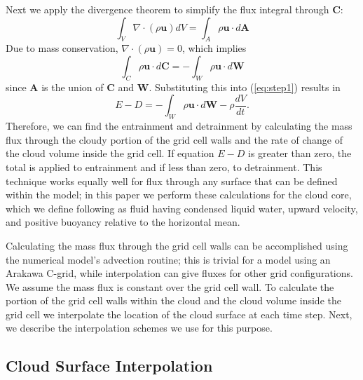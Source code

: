 \documentclass[12pt]{article}
\begin{document}
Next we apply the divergence theorem to simplify the flux integral through 
$\mathbf{C}$:
\begin{equation}
\label{eq:divergence} 
\int_{V} \nabla \cdot (\rho \mathbf{u}) dV = 
  \int_{A} \rho \mathbf{u}\cdot d\mathbf{A}
\end{equation}
Due to mass conservation, $\nabla \cdot (\rho \mathbf{u}) = 0$, which implies
\begin{equation}
\label{eq:divergence3} 
\int_{C} \rho \mathbf{u}\cdot d\mathbf{C} = - \int_{W} \rho \mathbf{u}\cdot d\mathbf{W}
\end{equation}
since $\mathbf{A}$ is the union of $\mathbf{C}$ and $\mathbf{W}$.  Substituting
this into (\ref{eq:step1}) results in
\begin{equation}
\label{eq:entrainment_detrainment} 
E - D = - \int_W \rho \mathbf{u} \cdot d\mathbf{W} - \rho \frac{dV}{dt}.
\end{equation}
Therefore, we can find the entrainment and detrainment by calculating the mass
flux through the cloudy portion of the grid cell walls and the rate of change
of the cloud volume inside the grid cell.  If equation $E - D$ is greater than 
zero, the total is applied to entrainment and if less than zero, to 
detrainment.  This technique works equally well for flux through any surface 
that can be defined within the model; in this paper we perform these 
calculations for the cloud core, which we define following \cite{Siebesma1995} 
as fluid having condensed liquid water, upward velocity, and positive buoyancy 
relative to the horizontal mean.  

Calculating the mass flux through the grid cell walls can be accomplished using 
the numerical model's advection routine; this is trivial for a model using an 
Arakawa C-grid, while interpolation can give fluxes for other grid 
configurations.  We assume the mass flux is constant over the grid cell wall.  
To calculate the portion of the grid cell walls within the cloud and the cloud 
volume inside the grid cell we interpolate the location of the cloud surface at 
each time step.  Next, we describe the interpolation schemes we use for this 
purpose.


\subsection{Cloud Surface Interpolation}
\end{document}
